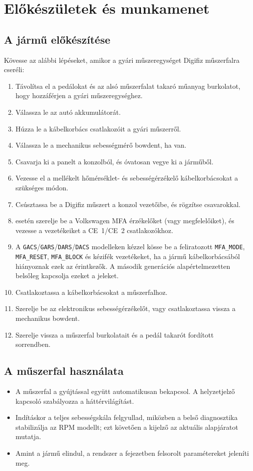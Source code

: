 \chapter{Előkészületek és munkamenet}\label{ch:preparation}

\section{A jármű előkészítése}
Kövesse az alábbi lépéseket, amikor a gyári műszeregységet Digifiz műszerfalra cseréli:
\begin{enumerate}
    \item Távolítsa el a pedálokat és az alsó műszerfalat takaró műanyag burkolatot, hogy hozzáférjen a gyári műszeregységhez.
    \item Válassza le az autó akkumulátorát.
    \item Húzza le a kábelkorbács csatlakozóit a gyári műszerről.
    \item Válassza le a mechanikus sebességmérő bowdent, ha van.
    \item Csavarja ki a panelt a konzolból, és óvatosan vegye ki a járműből.
    \item Vezesse el a mellékelt hőmérséklet- és sebességérzékelő kábelkorbácsokat a szükséges módon.
    \item Csúsztassa be a Digifiz műszert a konzol vezetőibe, és rögzítse csavarokkal.
    \item \ReplicaNextLong{} esetén szerelje be a Volkswagen MFA érzékelőket (vagy megfelelőiket), és vezesse a vezetékeiket a CE~1/CE~2 csatlakozókhoz.
    \item A \texttt{GACS}/\texttt{GARS}/\texttt{DARS}/\texttt{DACS} modelleken kézzel kösse be a feliratozott \texttt{MFA\_MODE}, \texttt{MFA\_RESET}, \texttt{MFA\_BLOCK} és kézifék vezetékeket, ha a jármű kábelkorbácsából hiányoznak ezek az érintkezők. A második generációs \ReplicaNextShort{} alapértelmezetten belsőleg kapcsolja ezeket a jeleket.
    \item Csatlakoztassa a kábelkorbácsokat a műszerfalhoz.
    \item Szerelje be az elektronikus sebességérzékelőt, vagy csatlakoztassa vissza a mechanikus bowdent.
    \item Szerelje vissza a műszerfal burkolatait és a pedál takarót fordított sorrendben.
\end{enumerate}

\section{A műszerfal használata}
\begin{itemize}
    \item A műszerfal a gyújtással együtt automatikusan bekapcsol. A helyzetjelző kapcsoló szabályozza a háttérvilágítást.
    \item Indításkor a teljes sebességskála felgyullad, miközben a belső diagnosztika stabilizálja az RPM modellt; ezt követően a kijelző az aktuális alapjáratot mutatja.
    \item Amint a jármű elindul, a rendszer a  fejezetben felsorolt paramétereket jeleníti meg.
\end{itemize}

